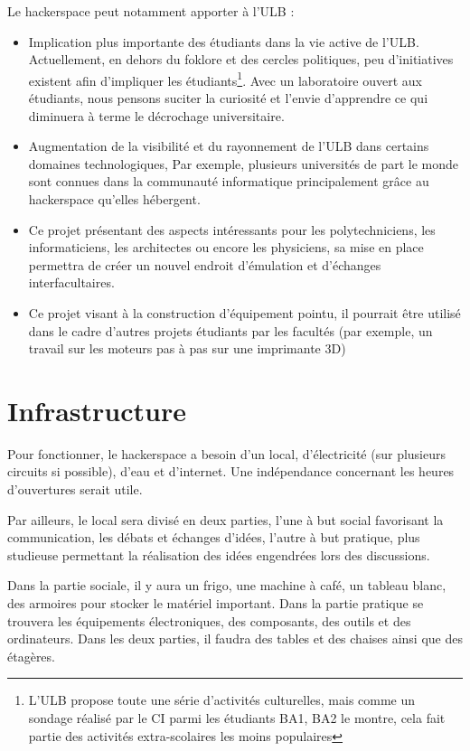 \documentclass{article}
\begin{document}
Le hackerspace peut notamment apporter à l'ULB : 
\begin{itemize}
\item Implication plus importante des étudiants dans la vie active de l'ULB.
Actuellement, en dehors du foklore et des cercles politiques, peu d'initiatives existent afin d'impliquer les étudiants\footnote{L'ULB
propose toute une série d'activités culturelles, mais comme un sondage réalisé par le CI parmi les étudiants BA1, BA2
le montre, cela fait partie des activités extra-scolaires les moins populaires}.
Avec un laboratoire ouvert aux étudiants, nous pensons suciter la curiosité et l'envie d'apprendre ce qui diminuera à terme le décrochage
universitaire.
\item Augmentation de la visibilité et du rayonnement de l'ULB dans certains domaines technologiques,
Par exemple, plusieurs universités de part le monde sont connues dans la communauté informatique
principalement grâce au hackerspace qu'elles hébergent.
\item Ce projet présentant des aspects intéressants pour les polytechniciens, les informaticiens,
les architectes ou encore les physiciens, sa mise en place permettra de créer un nouvel endroit d'émulation
et d'échanges interfacultaires.
\item Ce projet visant à la construction d'équipement pointu, il pourrait être utilisé dans le cadre d'autres projets étudiants par les facultés (par exemple, un travail sur les moteurs pas à pas sur une imprimante 3D)
\end{itemize}

\section{Infrastructure}

Pour fonctionner, le hackerspace a besoin d'un local, d'électricité 
(sur plusieurs circuits si possible), d'eau et d'internet. Une indépendance concernant les heures d'ouvertures serait utile.

Par ailleurs, le local sera divisé en deux parties, l'une à but social favorisant la communication, les débats et échanges d'idées, l'autre à but pratique, plus studieuse permettant la réalisation des idées engendrées lors des discussions. 

Dans la partie sociale, il y aura un frigo, une machine à café, un tableau blanc, 
des armoires pour stocker le matériel important.
\newline
Dans la partie pratique se trouvera les équipements électroniques, des composants, des outils et des ordinateurs.
\newline
Dans les deux parties, il faudra des tables et des chaises ainsi que des étagères.
\end{document}
